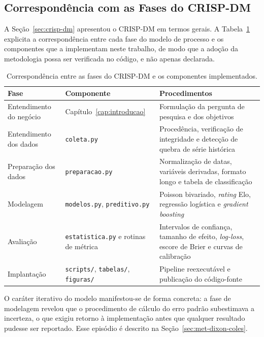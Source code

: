 \subsection{Correspondência com as Fases do CRISP-DM}\label{sec:crisp-mapa}

A Seção~\ref{sec:crisp-dm} apresentou o CRISP-DM em termos gerais. A
Tabela~\ref{tab:crisp} explicita a correspondência entre cada fase do modelo de
processo e os componentes que a implementam neste trabalho, de modo que a adoção
da metodologia possa ser verificada no código, e não apenas declarada.

\begin{table}[htb]
  \centering
  \caption{Correspondência entre as fases do CRISP-DM e os componentes
    implementados.}
  \label{tab:crisp}
  \small
  \begin{tabular}{@{}llp{6.2cm}@{}}
    \toprule
    \textbf{Fase} & \textbf{Componente} & \textbf{Procedimentos} \\
    \midrule
    Entendimento do negócio & Capítulo~\ref{cap:introducao} &
      Formulação da pergunta de pesquisa e dos objetivos \\
    Entendimento dos dados & \texttt{coleta.py} &
      Procedência, verificação de integridade e detecção de quebra de série
      histórica \\
    Preparação dos dados & \texttt{preparacao.py} &
      Normalização de datas, variáveis derivadas, formato longo e tabela de
      classificação \\
    Modelagem & \texttt{modelos.py}, \texttt{preditivo.py} &
      Poisson bivariado, \textit{rating} Elo, regressão logística e
      \textit{gradient boosting} \\
    Avaliação & \texttt{estatistica.py} e rotinas de métrica &
      Intervalos de confiança, tamanho de efeito, \textit{log-loss},
      escore de Brier e curvas de calibração \\
    Implantação & \texttt{scripts/}, \texttt{tabelas/}, \texttt{figuras/} &
      Pipeline reexecutável e publicação do código-fonte \\
    \bottomrule
  \end{tabular}
\end{table}

O caráter iterativo do modelo manifestou-se de forma concreta: a fase de
modelagem revelou que o procedimento de cálculo do erro padrão subestimava a
incerteza, o que exigiu retorno à implementação antes que qualquer resultado
pudesse ser reportado. Esse episódio é descrito na
Seção~\ref{sec:met-dixon-coles}.

